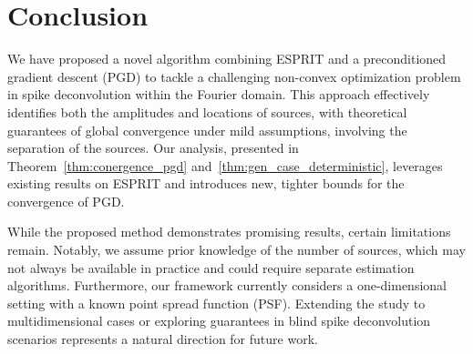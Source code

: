 \documentclass[conference,english]{IEEEtran}
\begin{document}
\section{Conclusion}\label{sec:conclusion}

We have proposed a novel algorithm combining ESPRIT and a preconditioned gradient descent (PGD) to tackle a challenging non-convex optimization problem in spike deconvolution within the Fourier domain. This approach effectively identifies both the amplitudes and locations of sources, with theoretical guarantees of global convergence under mild assumptions, involving the separation of the sources. Our analysis, presented in Theorem~\ref{thm:conergence_pgd} and~\ref{thm:gen_case_deterministic}, leverages existing results on ESPRIT and introduces new, tighter bounds for the convergence of PGD.

While the proposed method demonstrates promising results, certain limitations remain. Notably, we assume prior knowledge of the number of sources, which may not always be available in practice and could require separate estimation algorithms. Furthermore, our framework currently considers a one-dimensional setting with a known point spread function (PSF). Extending the study to multidimensional cases or exploring guarantees in blind spike deconvolution scenarios represents a natural direction for future work. 

\newpage
{}
\renewcommand*{\bibfont}{\footnotesize}
\printbibliography
\end{document}
